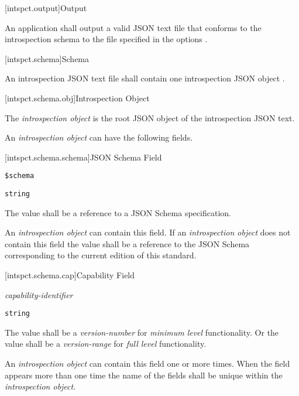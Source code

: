 [intspct.output]{Output}

\pnum
An application shall output a valid JSON text file that conforms to the
introspection schema  to the file specified in the options
.

[intspct.schema]{Schema}

\pnum
An introspection JSON text file shall contain one introspection JSON object
.

[intspct.schema.obj]{Introspection Object}

\pnum
The \emph{introspection object} is the root JSON object of the introspection
JSON text.

\pnum
An \emph{introspection object} can have the following fields.

[intspct.schema.schema]{JSON Schema Field}

\begin{itemdescr}

	\pnum
	\fldname
	\verb|$schema|

	\pnum
	\fldtype
	\verb|string|

	\pnum
	\fldval
	The value shall be a reference to a JSON Schema specification.

	\pnum
	\flddesc
	An \emph{introspection object} can contain this field.
	If an \emph{introspection object} does not contain this field the value
	shall be a reference to the JSON Schema corresponding to the current
	edition of this standard.

\end{itemdescr}

[intspct.schema.cap]{Capability Field}

\begin{itemdescr}

	\pnum
	\fldname
	\emph{capability-identifier} 

	\pnum
	\fldtype
	\verb|string|

	\pnum
	\fldval
	The value shall be a \emph{version-number} for \emph{minimum level}
	functionality.
	Or the value shall be a \emph{version-range} for \emph{full level}
	functionality.
  
	\pnum
	\flddesc
	An \emph{introspection object} can contain this field one or more times.
	When the field appears more than one time the name of the fields shall be
	unique within the \emph{introspection object}.
  
\end{itemdescr}

